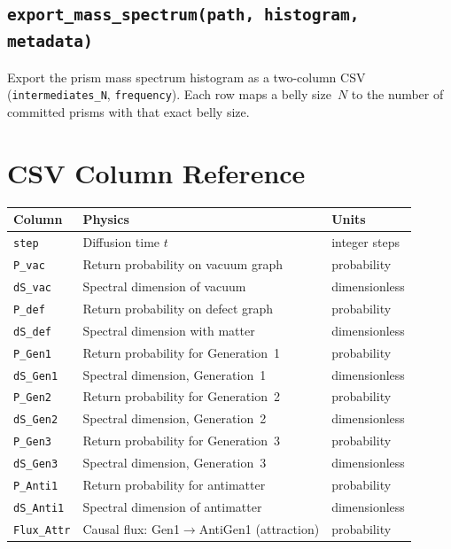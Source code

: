 \documentclass[11pt, a4paper, openany]{book}
\newcommand{\code}[1]{\texttt{#1}}
\newcommand{\func}[1]{\texttt{\color{structure}#1}}
\begin{document}
\subsection{\func{export\_mass\_spectrum(path, histogram, metadata)}}

Export the prism mass spectrum histogram as a two-column CSV
(\code{intermediates\_N}, \code{frequency}).  Each row maps a belly size~$N$
to the number of committed prisms with that exact belly size.

\section{CSV Column Reference}

\begin{table}[H]
\centering
\begin{tabular}{@{} l l l @{}}
\toprule
\textbf{Column} & \textbf{Physics} & \textbf{Units} \\
\midrule
\code{step}       & Diffusion time $t$                          & integer steps \\
\code{P\_vac}     & Return probability on vacuum graph          & probability \\
\code{dS\_vac}    & Spectral dimension of vacuum                & dimensionless \\
\code{P\_def}     & Return probability on defect graph          & probability \\
\code{dS\_def}    & Spectral dimension with matter              & dimensionless \\
\code{P\_Gen1}    & Return probability for Generation~1         & probability \\
\code{dS\_Gen1}   & Spectral dimension, Generation~1            & dimensionless \\
\code{P\_Gen2}    & Return probability for Generation~2         & probability \\
\code{dS\_Gen2}   & Spectral dimension, Generation~2            & dimensionless \\
\code{P\_Gen3}    & Return probability for Generation~3         & probability \\
\code{dS\_Gen3}   & Spectral dimension, Generation~3            & dimensionless \\
\code{P\_Anti1}   & Return probability for antimatter           & probability \\
\code{dS\_Anti1}  & Spectral dimension of antimatter            & dimensionless \\
\code{Flux\_Attr} & Causal flux: Gen1$\to$AntiGen1 (attraction) & probability \\

\end{tabular}
\end{table}
\end{document}
